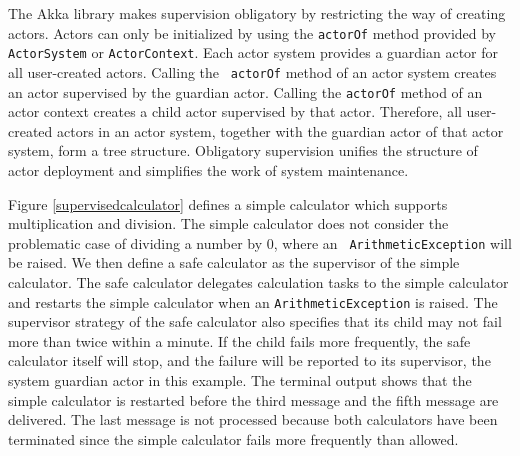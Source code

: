 The Akka library makes supervision obligatory by restricting the way of 
creating actors. Actors can only be initialized by using the {\tt actorOf}
method provided by {\tt ActorSystem} or {\tt ActorContext}.  Each actor system
provides a guardian actor for all user-created actors.  Calling the {\tt
actorOf} method of an actor system creates an actor supervised by the 
guardian actor.  Calling the {\tt actorOf} method of an actor context 
creates a child actor supervised by that actor.  Therefore, all user-created  
actors in an actor system, together with the guardian actor of that actor 
system, form a tree structure.  Obligatory supervision unifies the 
structure of actor deployment and simplifies the work of system maintenance.

\begin{comment}
Each actor in Akka is associated with an actor path.  The string representation
of the actor path of a guardian actor has format 
{\it akka://mysystem@IP:port/user}, where {\it mysystem} is the name of the 
actor system, {\it IP} and {\it port} are the IP address and the 
port number which the actor system listens to, and {\it user} is the name of 
the guardian actor.  The actor path of a child actor is actor path of its 
supervisor appended by the name of the child actor, either a user specified 
name or a system generated name. 
\end{comment}

Figure \ref{supervisedcalculator} defines a simple calculator which supports
multiplication and division. The simple calculator does not consider the
problematic case of dividing a number by 0, where an {\tt
ArithmeticException} will be raised.  We then define a safe calculator as the 
supervisor of the simple calculator.  The safe calculator delegates 
calculation tasks to the simple calculator and restarts the simple calculator 
when an {\tt ArithmeticException} is raised.  The supervisor strategy of
the safe calculator also specifies that its child may not fail more than twice 
within a minute.  If the child fails more frequently, the safe calculator 
itself will stop, and the failure will be reported to its supervisor, the 
system guardian actor in this example.  The terminal output shows that the 
simple calculator is restarted before the third message and the fifth message 
are delivered.  The last message is not processed because both calculators 
have been terminated since the simple calculator fails more frequently than 
allowed.

